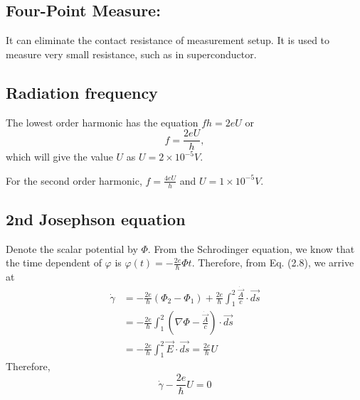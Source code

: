 \subsection{Four-Point Measure:}

It can eliminate the contact resistance of measurement setup. It is
used to measure very small resistance, such as in superconductor.

\subsection{Radiation frequency}

The lowest order harmonic has the equation $fh=2eU$ or 
\begin{equation}
f=\frac{2eU}{h},
\end{equation}
 which will give the value $U$ as $U=2\times10^{-5}V$.

For the second order harmonic, $f=\frac{4eU}{h}$ and $U=1\times10^{-5}V$.

\subsection{2nd Josephson equation}

Denote the scalar potential by $\Phi$. From the Schrodinger equation,
we know that the time dependent of $\varphi$ is $\varphi(t)=-\frac{2e}{\hbar}\Phi t$.
Therefore, from Eq. (2.8), we arrive at 
\begin{align}
\dot{\gamma} & =-\frac{2e}{\hbar}(\Phi_{2}-\Phi_{1})+\frac{2e}{\hbar}\int_{1}^{2}\frac{\dot{\overrightarrow{A}}}{c}\cdot\overrightarrow{ds}\nonumber \\
 & =-\frac{2e}{\hbar}\int_{1}^{2}(\nabla\Phi-\frac{\dot{\overrightarrow{A}}}{c})\cdot\overrightarrow{ds}\nonumber \\
 & =-\frac{2e}{\hbar}\int_{1}^{2}\overrightarrow{E}\cdot\overrightarrow{ds}=\frac{2e}{\hbar}U
\end{align}
Therefore, 
\begin{equation}
\dot{\gamma}-\frac{2e}{\hbar}U=0
\end{equation}



